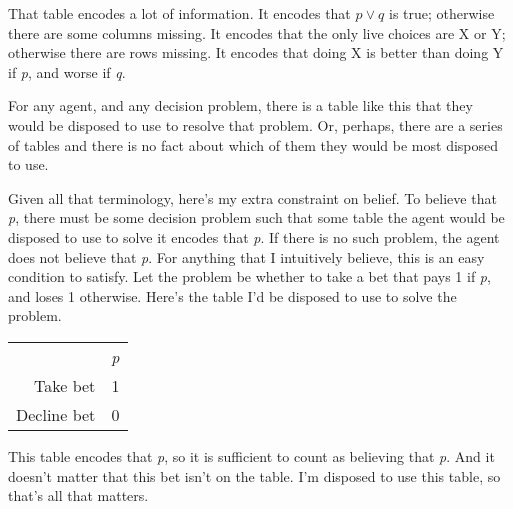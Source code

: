%
%
%

That table encodes a lot of information. It encodes that $p \vee q$ is true; otherwise there are some columns missing. It encodes that the only live choices are X or Y; otherwise there are rows missing. It encodes that doing X is better than doing Y if \emph{p}, and worse if \emph{q}. 

For any agent, and any decision problem, there is a table like this that they would be disposed to use to resolve that problem. Or, perhaps, there are a series of tables and there is no fact about which of them they would be most disposed to use.

Given all that terminology, here's my extra constraint on belief. To believe that \emph{p}, there must be some decision problem such that some table the agent would be disposed to use to solve it encodes that \emph{p}. If there is no such problem, the agent does not believe that \emph{p}. For anything that I intuitively believe, this is an easy condition to satisfy. Let the problem be whether to take a bet that pays 1 if \emph{p}, and loses 1 otherwise. Here's the table I'd be disposed to use to solve the problem.

\begin{center}
\begin{tabular}{rc}
&\emph{p}\\
Take bet&1\\
Decline bet&0\\
\end{tabular}
\end{center}
%
%
%
%
This table encodes that \emph{p}, so it is sufficient to count as believing that \emph{p}. And it doesn't matter that this bet isn't on the table. I'm disposed to use this table, so that's all that matters.

